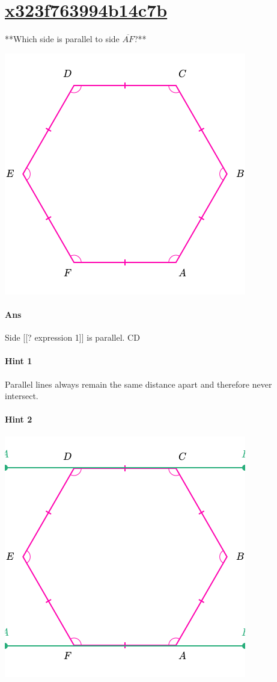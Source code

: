 \documentclass[twocolumn,10pt]{article}
\def\shrinkfactor{0.55}
\begin{document}
\section{\href{https://www.khanacademy.org/devadmin/content/items/x323f763994b14c7b}{x323f763994b14c7b}}

\noindent
**Which side is parallel to side $\overline{AF}$?**


\includegraphics[scale=\shrinkfactor]{figures/28503190185ac259dd94d90087b4ef7971a78c3e.png}

\paragraph{Ans} Side  [[? expression 1]] is parallel.
  CD

\paragraph{Hint 1}Parallel lines always remain the same distance apart and therefore never intersect. 

\paragraph{Hint 2}
\includegraphics[scale=\shrinkfactor]{figures/0785bb6725a0a8c444685da8dcf856a59a09aacc.png}
\end{document}
